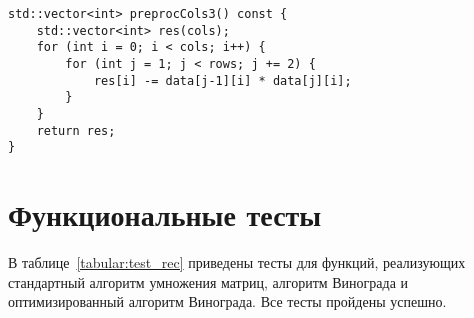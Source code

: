 \clearpage
\begin{lstlisting}[label=lst:Cols,caption=Функция предобработки столбцов с оптимизациями]
std::vector<int> preprocCols3() const {
	std::vector<int> res(cols);
	for (int i = 0; i < cols; i++) {
		for (int j = 1; j < rows; j += 2) {
			res[i] -= data[j-1][i] * data[j][i];
		}
	}
	return res;
}
\end{lstlisting}

\section{Функциональные тесты}
В таблице~\ref{tabular:test_rec} приведены тесты для функций, реализующих стандартный алгоритм умножения матриц, алгоритм Винограда и оптимизированный алгоритм Винограда. Все тесты пройдены успешно.

